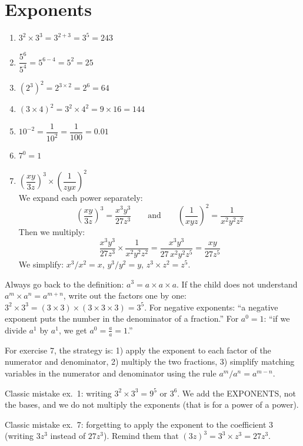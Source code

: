 \documentclass[11pt,a4paper]{article}
\newcommand{\corrbox}[1]{
\begin{tcolorbox}[colback=correctgreen!8!white,colframe=correctgreen!60!black]
#1
\end{tcolorbox}
}
\newcommand{\tipbox}[1]{
\begin{tcolorbox}[colback=tipblue!8!white,colframe=tipblue!60!black,title=\textbf{How to explain}]
#1
\end{tcolorbox}
}
\newcommand{\warnbox}[1]{
\begin{tcolorbox}[colback=warnred!8!white,colframe=warnred!60!black,title=\textbf{Common mistakes}]
#1
\end{tcolorbox}
}
\begin{document}
\section{Exponents}

\corrbox{
\begin{enumerate}
\item $3^{2} \times 3^{3} = 3^{2+3} = 3^{5} = 243$
\item $\dfrac{5^{6}}{5^{4}} = 5^{6-4} = 5^{2} = 25$
\item $(2^{3})^{2} = 2^{3 \times 2} = 2^{6} = 64$
\item $(3 \times 4)^{2} = 3^{2} \times 4^{2} = 9 \times 16 = 144$
\item $10^{-2} = \dfrac{1}{10^{2}} = \dfrac{1}{100} = 0.01$
\item $7^{0} = 1$
\item $\left(\dfrac{xy}{3z}\right)^{3} \times \left(\dfrac{1}{zyx}\right)^{2}$\\[0.3cm]
We expand each power separately:
\[
\left(\dfrac{xy}{3z}\right)^{3} = \dfrac{x^{3}y^{3}}{27z^{3}}
\qquad\text{and}\qquad
\left(\dfrac{1}{xyz}\right)^{2} = \dfrac{1}{x^{2}y^{2}z^{2}}
\]
Then we multiply:
\[
\dfrac{x^{3}y^{3}}{27z^{3}} \times \dfrac{1}{x^{2}y^{2}z^{2}} = \dfrac{x^{3}y^{3}}{27\,x^{2}y^{2}z^{5}} = \dfrac{xy}{27z^{5}}
\]
We simplify: $x^{3}/x^{2} = x$, \; $y^{3}/y^{2} = y$, \; $z^{3} \times z^{2} = z^{5}$.
\end{enumerate}
}

\tipbox{
Always go back to the definition: $a^{3} = a \times a \times a$. If the child does not understand $a^{m} \times a^{n} = a^{m+n}$, write out the factors one by one: $3^{2} \times 3^{3} = (3 \times 3) \times (3 \times 3 \times 3) = 3^{5}$. For negative exponents: ``a negative exponent puts the number in the denominator of a fraction.'' For $a^{0} = 1$: ``if we divide $a^{1}$ by $a^{1}$, we get $a^{0} = \frac{a}{a} = 1$.''

\vspace{0.2cm}
For exercise 7, the strategy is: 1) apply the exponent to each factor of the numerator and denominator, 2) multiply the two fractions, 3) simplify matching variables in the numerator and denominator using the rule $a^{m}/a^{n} = a^{m-n}$.
}

\warnbox{
Classic mistake ex.~1: writing $3^{2} \times 3^{3} = 9^{5}$ or $3^{6}$. We add the EXPONENTS, not the bases, and we do not multiply the exponents (that is for a power of a power).

\vspace{0.2cm}
Classic mistake ex.~7: forgetting to apply the exponent to the coefficient $3$ (writing $3z^{3}$ instead of $27z^{3}$). Remind them that $(3z)^{3} = 3^{3} \times z^{3} = 27z^{3}$.
}
\end{document}
